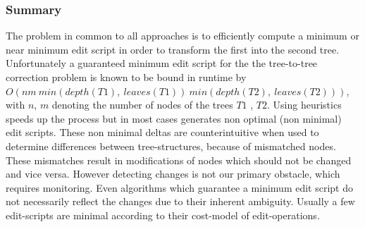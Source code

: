 


\subsubsection{Summary}
The problem in common to all approaches is to efficiently compute a minimum or near minimum edit script in order to transform the first into the second tree. Unfortunately a guaranteed minimum edit script for the the tree-to-tree correction problem is known to be bound in runtime by \\$O(nm\ min(depth(T1),\ leaves(T1))\ min(depth(T2),\ leaves(T2)))$, with $n$, $m$ denoting the number of nodes of the trees $T1$ , $T2$\cite{Zhang:1989:SFA:76071.76082}. Using heuristics speeds up the process but in most cases generates non optimal (non minimal) edit scripts. These non minimal deltas are counterintuitive when used to determine differences between tree-structures, because of mismatched nodes. These mismatches result in modifications of nodes which should not be changed and vice versa. However detecting changes is not our primary obstacle, which requires monitoring. Even algorithms which guarantee a minimum edit script do not necessarily reflect the changes due to their inherent ambiguity. Usually a few edit-scripts are minimal according to their cost-model of edit-operations.

